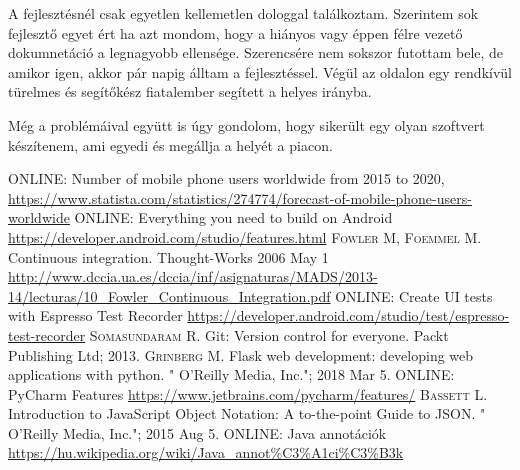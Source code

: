 \documentclass{thesis-ekf}
\theoremstyle{definition}
\theoremstyle{remark}
\begin{document}
A fejlesztésnél csak egyetlen kellemetlen dologgal találkoztam. Szerintem sok fejlesztő egyet ért ha azt mondom, hogy a hiányos vagy éppen félre vezető dokumnetáció a legnagyobb ellensége.
Szerencsére nem sokszor futottam bele, de amikor igen, akkor pár napig álltam a fejlesztéssel. Végül az oldalon egy rendkívül türelmes és segítőkész fiatalember segített a helyes irányba. 

Még a problémáival együtt is úgy gondolom, hogy sikerült egy olyan szoftvert készítenem, ami egyedi és megállja a helyét a piacon. 


\begin{thebibliography}{1}
 \textsc{ONLINE}: Number of mobile phone users worldwide from 2015 to 2020, \url{https://www.statista.com/statistics/274774/forecast-of-mobile-phone-users-worldwide}
 \textsc{ONLINE}: Everything you need to build on Android \url{https://developer.android.com/studio/features.html}
 \textsc{Fowler M, Foemmel M.} Continuous integration. Thought-Works 2006 May 1 \url{http://www.dccia.ua.es/dccia/inf/asignaturas/MADS/2013-14/lecturas/10_Fowler_Continuous_Integration.pdf}
 \textsc{ONLINE}: Create UI tests with Espresso Test Recorder \url{https://developer.android.com/studio/test/espresso-test-recorder}
 \textsc{Somasundaram R.} Git: Version control for everyone. Packt Publishing Ltd; 2013.
 \textsc{Grinberg M.} Flask web development: developing web applications with python. " O'Reilly Media, Inc."; 2018 Mar 5.
 \textsc{ONLINE}: PyCharm Features \url{https://www.jetbrains.com/pycharm/features/}
 \textsc{Bassett L.} Introduction to JavaScript Object Notation: A to-the-point Guide to JSON. " O'Reilly Media, Inc."; 2015 Aug 5.
 \textsc{ONLINE}: Java annotációk \url{https://hu.wikipedia.org/wiki/Java_annot%C3%A1ci%C3%B3k}
\end{thebibliography}
\end{document}
